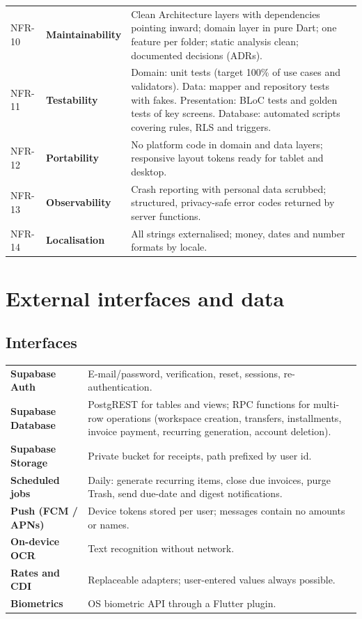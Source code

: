 \documentclass[11pt,a4paper]{article}
\begin{document}
\begin{tabularx}{\textwidth}{@{}l >{\bfseries}l X@{}}
NFR-10 & Maintainability & Clean Architecture layers with dependencies pointing inward; domain layer in pure Dart; one feature per folder; static analysis clean; documented decisions (ADRs). \\
NFR-11 & Testability & Domain: unit tests (target 100\% of use cases and validators). Data: mapper and repository tests with fakes. Presentation: BLoC tests and golden tests of key screens. Database: automated scripts covering rules, RLS and triggers. \\
NFR-12 & Portability & No platform code in domain and data layers; responsive layout tokens ready for tablet and desktop. \\
NFR-13 & Observability & Crash reporting with personal data scrubbed; structured, privacy-safe error codes returned by server functions. \\
NFR-14 & Localisation & All strings externalised; money, dates and number formats by locale. \\
\bottomrule
\end{tabularx}

\section{External interfaces and data}

\subsection{Interfaces}
\begin{tabularx}{\textwidth}{@{}>{\bfseries}l X@{}}
\toprule
Supabase Auth & E-mail/password, verification, reset, sessions, re-authentication. \\
Supabase Database & PostgREST for tables and views; RPC functions for multi-row operations (workspace creation, transfers, installments, invoice payment, recurring generation, account deletion). \\
Supabase Storage & Private bucket for receipts, path prefixed by user id. \\
Scheduled jobs & Daily: generate recurring items, close due invoices, purge Trash, send due-date and digest notifications. \\
Push (FCM / APNs) & Device tokens stored per user; messages contain no amounts or names. \\
On-device OCR & Text recognition without network. \\
Rates and CDI & Replaceable adapters; user-entered values always possible. \\
Biometrics & OS biometric API through a Flutter plugin. \\
\bottomrule
\end{tabularx}
\end{document}

